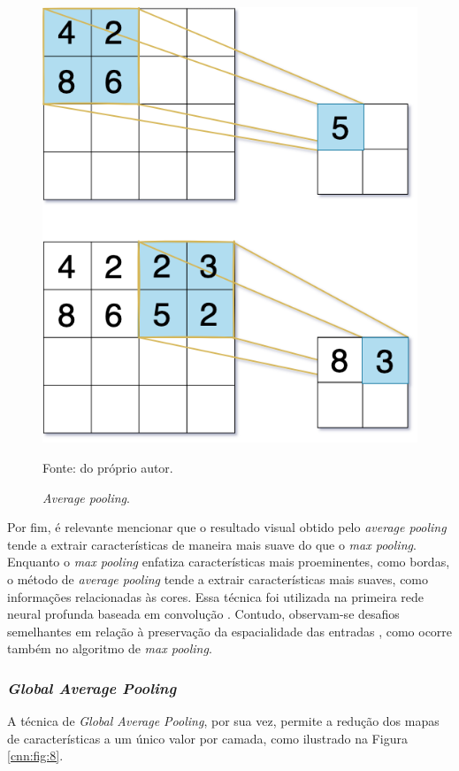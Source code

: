 \begin{figure}[H]
    \centering
    \caption{\textit{Average pooling}.}
    \includegraphics[width=0.5\linewidth]{recursos/imagens/deep/avgpooling.png}
    \label{cnn:fig:avg_pooling}

    Fonte: do próprio autor.
\end{figure}

Por fim, é relevante mencionar que o resultado visual obtido pelo \textit{average pooling} tende a extrair características de maneira mais suave do que o \textit{max pooling}. Enquanto o \textit{max pooling} enfatiza características mais proeminentes, como bordas, o método de \textit{average pooling} tende a extrair características mais suaves, como informações relacionadas às cores. Essa técnica foi utilizada na primeira rede neural profunda baseada em convolução \citep{LeCun1998Gradient-basedRecognition}. Contudo, observam-se desafios semelhantes em relação à preservação da espacialidade das entradas \citep{Liu2019Multi-LevelNetworks}, como ocorre também no algoritmo de \textit{max pooling}.

\subsubsection{\textit{Global Average Pooling}}
\label{cnn:pooling:global_avg_pooling}
A técnica de \textit{Global Average Pooling}, por sua vez, permite a redução dos mapas de características a um único valor por camada, como ilustrado na Figura \ref{cnn:fig:8}.

